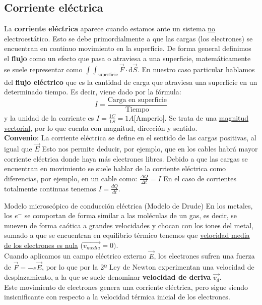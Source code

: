 \subsection{Corriente eléctrica}
La \textbf{corriente eléctrica} aparece cuando estamos ante un sistema \underline{no} electroestático. Esto se debe primordialmente a que las cargas (los electrones) se encuentran en continuo movimiento en la superficie. 
De forma general definimos el \textbf{flujo} como un efecto que pasa o atraviesa a una superficie, matemáticamente se suele representar como $\int\int_{\text{superficie}}\vec{F}\cdot \mathrm{d}\vec{S}$.
En nuestro caso particular hablamos del \textbf{flujo eléctrico} que es la cantidad de carga que atraviesa una superficie en un determinado tiempo. Es decir, viene dado por la fórmula: $$I = \frac{\text{Carga en superficie}}{\text{Tiempo}}$$
y la unidad de la corriente es ${I}=\frac{1C}{1S} = 1A$[Amperio].
Se trata de una \underline{magnitud vectorial}, por lo que cuenta con magnitud, dirección y sentido. \\
\textbf{Convenio}: La corriente eléctrica se define en el sentido de las cargas positivas, al igual que $\vec{E}$ Esto nos permite deducir, por ejemplo, que en los cables habrá mayor corriente eléctrica donde haya más electrones libres. 
Debido a que las cargas se encuentran en movimiento se suele hablar de la corriente eléctrica como diferencias, por ejemplo, en un cable como: 
$\frac{\Delta Q}{\Delta t} = I$ En el caso de corrientes totalmente continuas tenemos $I = \frac{dQ}{dt}$. \\
\begin{teorema}{Modelo microscópico de conducción eléctrica (Modelo de Drude)}
    En los metales, los $e^-$ se comportan de forma similar a las moléculas de un gas, es decir, se mueven de forma caótica a grandes velocidades y chocan con los iones del metal, sumado a que se encuentran en equilibrio térmico tenemos que \underline{velocidad media de los electrones es nula} ($\vec{v_{media}}=0)$.\\
    Cuando aplicamos un campo eléctrico externo $\vec{E}$, los electrones sufren una fuerza de $\vec{F} = -e\vec{E}$, por lo que por la 2º Ley de Newton experimentan una velocidad de desplazamiento, a la que se suele denominar \textbf{velocidad de deriva} $\vec{v_d}$.\\ Este movimiento de electrones genera una corriente eléctrica, pero sigue siendo insicnificante con respecto a la velocidad térmica inicial de los electrones.
\end{teorema}
